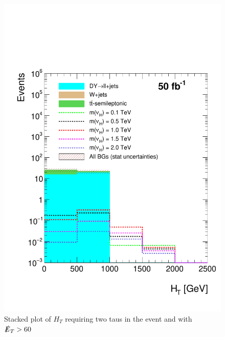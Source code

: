 \begin{figure}[htbp!]
\centering
\includegraphics[width=0.9\linewidth]{StackPlots/HT_2Taus_met60_50ifb_2moreSignals.pdf}
\caption{Stacked plot of $H_{T}$ requiring two taus in the event and with $\slashed{E}_{T} > 60$}
\label{fig: HT2tausMet60}
\end{figure}




